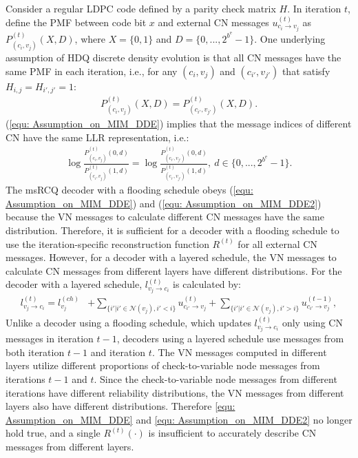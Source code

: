 \documentclass [PhD] {uclathes}
\begin{document}
Consider a  regular LDPC code defined by a parity check matrix $H$. In iteration $t$, define the PMF between code bit $x$ and external CN messages $u^{(t)}_{c_i \rightarrow v_j}$ as $P^{(t)}_{(c_i,v_j)}(X,D)$, where $X=\{0,1\}$ and $D=\{0,...,2^{b^\mathrm{e}}-1\}$. One underlying assumption of HDQ discrete density evolution is that all CN messages have the same PMF in each iteration, i.e., for any $(c_{i},v_{j})$ and $(c_{i'}, v_{j'})$ that satisfy $H_{i,j}=H_{i',j'}=1$:
\begin{align}
    P^{(t)}_{(c_i,v_j)}(X,D) = P^{(t)}_{(c_{i'},v_{j'})}(X,D).
    \label{equ: Assumption_on_MIM_DDE}
\end{align}
(\ref{equ: Assumption_on_MIM_DDE}) implies that the message indices of different CN have the same LLR representation, i.e.:
\begin{align}
    \log\frac{P^{(t)}_{(c_i,v_j)}(0,d)}{P^{(t)}_{(c_i,v_j)}(1,d)} = \log\frac{P^{(t)}_{(c_{i'},v_{j'})}(0,d)}{P^{(t)}_{(c_{i'},v_{j'})}(1,d)},~   d\in \{0,...,2^{b^\mathrm{e}}-1\}.
    \label{equ: Assumption_on_MIM_DDE2}
\end{align}
 The msRCQ decoder with a flooding schedule obeys (\ref{equ: Assumption_on_MIM_DDE}) and (\ref{equ: Assumption_on_MIM_DDE2})  because the VN messages to calculate different CN messages have the same distribution. Therefore, it is sufficient for a decoder with a flooding schedule  to use the iteration-specific reconstruction function  $R^{(t)}$ for all external CN messages. However, for a decoder with a layered schedule, the VN messages to calculate CN messages from different layers have different distributions. For the decoder with a layered schedule, $l^{(t)}_{v_j\rightarrow c_i}$ is calculated by:
\begin{align}\label{equ: vari_update_2}
    l^{(t)}_{v_j\rightarrow c_i} = l^{(ch)}_{v_j}&+ \sum_{\{i'|{i'}\in\mathcal{N}(v_j),i'<i\}}u^{(t)}_{c_{i'}\rightarrow v_{j}}+ \sum_{\{i'|{i'}\in\mathcal{N}(v_j),i'>i\}}u^{(t-1)}_{c_{i'}\rightarrow v_{j}},
\end{align}
Unlike a decoder using a flooding schedule, which updates $ l^{(t)}_{v_j\rightarrow c_i}$ only using CN messages in iteration $t-1$, decoders using a layered schedule use messages from both iteration $t-1$ and iteration $t$. The VN messages computed in different layers utilize different proportions of check-to-variable node messages from iterations $t-1$ and $t$.  Since the check-to-variable node messages from different iterations have different reliability distributions, the VN messages from different layers also have different distributions. Therefore \eqref{equ: Assumption_on_MIM_DDE} and \eqref{equ: Assumption_on_MIM_DDE2} no longer hold true, and a single $R^{(t)}(\cdot)$ is insufficient to accurately describe CN messages from different layers. 
\end{document}
